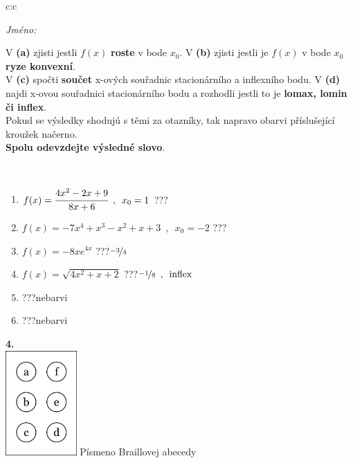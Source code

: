 \documentclass[10pt]{report}
\begin{document}
\begin{tabular}{c:c}
\begin{minipage}[c][104.5mm][t]{0.5\linewidth}
\begin{center}
\textit{Jméno:}\phantom{xxxxxxxxxxxxxxxxxxxxxxxxxxxxxxxxxxxxxxxxxxxxxxxxxxxxxxxxxxxxxxxxx}\\[5mm]
\begin{minipage}{0.95\linewidth}
\begin{center}
{\small V \textbf{(a)} zjisti jestli $f(x)$ \textbf{roste} v bode $x_0$. V \textbf{(b)} zjisti jestli je $f(x)$ v bode $x_0$ \textbf{ryze konvexní}.\\V \textbf{(c)} spočti \textbf{součet} x-ových souřadnic stacionárního a inflexního bodu. V \textbf{(d)} najdi x-ovou souřadnici stacionárního bodu a rozhodli jestli to je \textbf{lomax, lomin či inflex}.\\Pokud se výsledky shodujú s těmi za otazníky, tak napravo obarvi příslušející kroužek načerno.\\\textbf{Spolu odevzdejte výsledné slovo}}.
\end{center}
\end{minipage}
\\[1mm]
\begin{minipage}{0.79\linewidth}
\begin{center}
\begin{varwidth}{\linewidth}
\begin{enumerate}
\normalsize
\item $f(x)=\cfrac{4x^2-2x+9}{8x+6}\enspace , \enspace x_0=1$\quad \dotfill\; ???\;\dotfill \quad {}
\item $f(x)=-7x^4+x^3-x^2+x+3\enspace , \enspace x_0=-2$\quad \dotfill\; ???\;\dotfill \quad {}
\item $f(x)=-8xe^{4x}$\quad \dotfill\; ???\;\dotfill \quad $\nicefrac{-3}{4}$
\item $f(x)=\sqrt{4x^2+x+2}$\quad \dotfill\; ???\;\dotfill \quad $\nicefrac{-1}{8}\enspace , \enspace\mathrm{inflex}$
\item \quad \dotfill\; ???\;\dotfill \quad nebarvi
\item \quad \dotfill\; ???\;\dotfill \quad nebarvi
\end{enumerate}
\end{varwidth}
\end{center}
\end{minipage}
\begin{minipage}{0.20\linewidth}
\begin{center}
{\Huge\bfseries 4.} \\[2mm]
\includegraphics[height=40mm]{../images/braille.png}
{\small Písmeno Braillovej abecedy}
\end{center}
\end{minipage}
\end{center}
\end{minipage}
%
\end{tabular}
\end{document}
